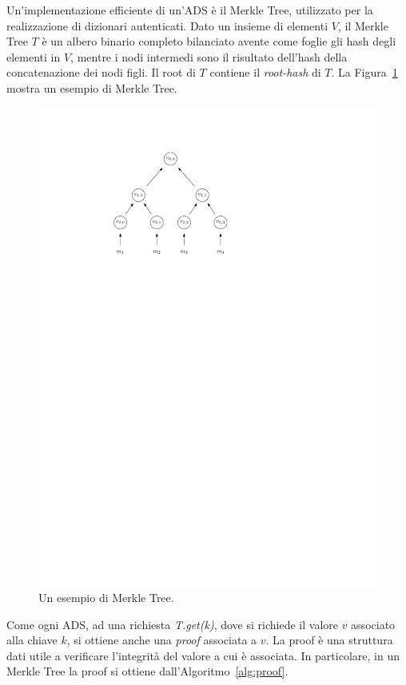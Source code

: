 Un'implementazione efficiente di un'ADS è il Merkle Tree, utilizzato per la realizzazione di dizionari autenticati. Dato un insieme di elementi $V$, il Merkle Tree $T$ è un albero binario completo bilanciato avente come foglie gli hash degli elementi in $V$, mentre i nodi intermedi sono il risultato dell'hash della concatenazione dei nodi figli. Il root di $T$ contiene il \emph{root-hash} di $T$. La Figura~\ref{fig:mht} mostra un esempio di Merkle Tree.

\begin{figure}
	\centering
	\includegraphics{img/capuno/mht.pdf}
	\caption{Un esempio di Merkle Tree.}
	\label{fig:mht}
\end{figure}

Come ogni ADS, ad una richiesta \emph{T.get(k)}, dove si richiede il valore $v$ associato alla chiave $k$, si ottiene anche una \emph{proof} associata a $v$. La proof è una struttura dati utile a verificare l'integrità del valore a cui è associata. In particolare, in un Merkle Tree la proof si ottiene dall'Algoritmo~\ref{alg:proof}.

